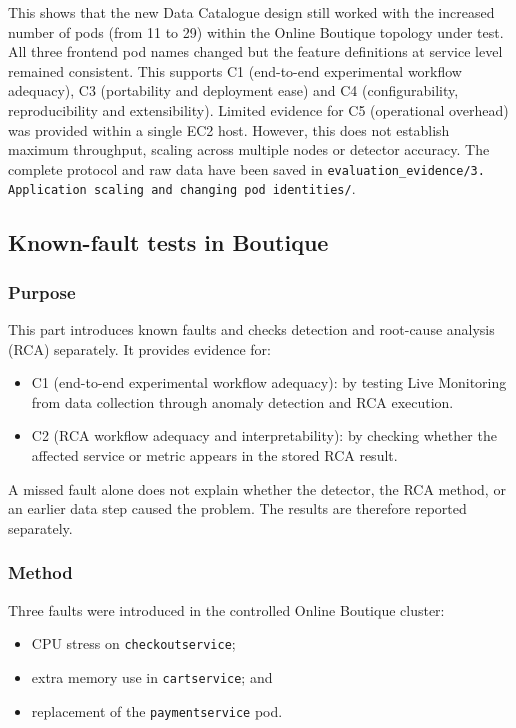 This shows that the new Data Catalogue design still worked with the increased number of pods (from 11 to 29) within the Online Boutique topology under test. All three frontend pod names changed but the feature definitions at service level remained consistent. This supports C1 (end-to-end experimental workflow adequacy), C3 (portability and deployment ease) and C4 (configurability, reproducibility and extensibility). Limited evidence for C5 (operational overhead) was provided within a single EC2 host. However, this does not establish maximum throughput, scaling across multiple nodes or detector accuracy. The complete protocol and raw data have been saved in \texttt{evaluation\_evidence/3. Application scaling and changing pod identities/}.

\subsection{Known-fault tests in Boutique}

\subsubsection{Purpose}

This part introduces known faults and checks detection and root-cause analysis (RCA) separately. It provides evidence for:
\begin{itemize}
    \item C1 (end-to-end experimental workflow adequacy): by testing Live Monitoring from data collection through anomaly detection and RCA execution.
    \item C2 (RCA workflow adequacy and interpretability): by checking whether the affected service or metric appears in the stored RCA result.
\end{itemize}
A missed fault alone does not explain whether the detector, the RCA method, or an earlier data step caused the problem. The results are therefore reported separately.

\subsubsection{Method}

Three faults were introduced in the controlled Online Boutique cluster:
\begin{itemize}
    \item CPU stress on \texttt{checkoutservice};
    \item extra memory use in \texttt{cartservice}; and
    \item replacement of the \texttt{paymentservice} pod.
\end{itemize}

